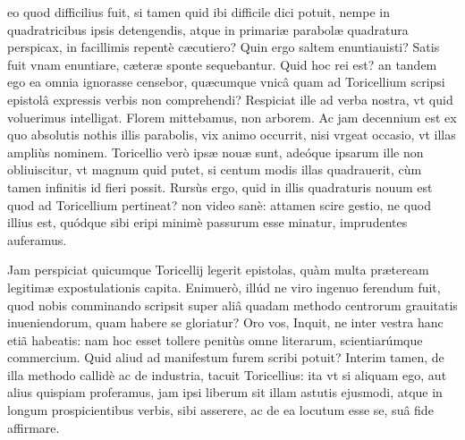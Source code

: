 \documentclass[11pt,a4paper]{article}
\begin{document}

eo quod difficilius fuit, si tamen quid ibi difficile dici potuit, nempe in quadratricibus ipsis detengendis, atque in primariæ parabolæ quadratura perspicax, in facillimis repentè cæcutiero? Quin ergo saltem enuntiauisti? Satis fuit vnam enuntiare, cæteræ sponte sequebantur. Quid hoc rei est? an tandem ego ea omnia ignorasse censebor, quæcumque vnicâ quam ad Toricellium scripsi epistolâ expressis verbis non comprehendi? Respiciat ille ad verba nostra, vt quid voluerimus intelligat. Florem mittebamus, non arborem. Ac jam decennium est ex quo absolutis nothis illis parabolis, vix animo occurrit, nisi vrgeat occasio, vt illas ampliùs nominem. Toricellio verò ipsæ nouæ sunt, adeóque ipsarum ille non obliuiscitur, vt magnum quid putet, si centum modis illas quadrauerit, cùm tamen infinitis id fieri possit. Rursùs ergo, quid in illis quadraturis nouum est quod ad Toricellium pertineat? non video sanè: attamen scire gestio, ne quod illius est, quódque sibi eripi minimè passurum esse minatur, imprudentes auferamus.

Jam perspiciat quicumque Toricellij legerit epistolas, quàm multa præteream legitimæ expostulationis capita. Enimuerò, illúd ne viro ingenuo ferendum fuit, quod nobis comminando scripsit super aliâ quadam methodo centrorum grauitatis inueniendorum, quam habere se gloriatur? Oro vos, Inquit, ne inter vestra hanc etiã habeatis: nam hoc esset tollere penitùs omne literarum, scientiarúmque commercium. Quid aliud ad manifestum furem scribi potuit? Interim tamen, de illa methodo callidè ac de industria, tacuit Toricellius: ita vt si aliquam ego, aut alius quispiam proferamus, jam ipsi liberum sit illam astutis ejusmodi, atque in longum prospicientibus verbis, sibi asserere, ac de ea locutum esse se, suâ fide affirmare.
\end{document}
